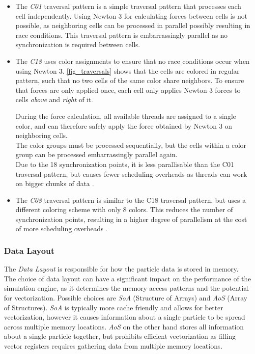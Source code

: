 \documentclass[conference]{IEEEtran}
\begin{document}
\begin{itemize}
    \item The \textit{C01} traversal pattern is a simple traversal pattern that processes each cell independently. Using Newton 3 for calculating forces between cells is not possible, as neighboring cells can be processed in parallel possibly resulting in race conditions. This traversal pattern is embarrassingly parallel as no synchronization is required between cells.
    \item The \textit{C18} uses color assignments to ensure that no race conditions occur when using Newton 3. \autoref{fig_traversals} shows that the cells are colored in regular pattern, such that no two cells of the same color share neighbors. To ensure that forces are only applied once, each cell only applies Newton 3 forces to cells \textit{above} and \textit{right} of it.

          During the force calculation, all available threads are assigned to a single color, and can therefore safely apply the force obtained by Newton 3 on neighboring cells. \\
          The color groups must be processed sequentially, but the cells within a color group can be processed embarrassingly parallel again. \\
          Due to the 18 synchronization points, it is less parallisable than the C01 traversal pattern, but causes fewer scheduling overheads as threads can work on bigger chunks of data \cite{NEWCOME2023115278}.
    \item The \textit{C08} traversal pattern is similar to the C18 traversal pattern, but uses a different coloring scheme with only 8 colors. This reduces the number of synchronization points, resulting in a higher degree of parallelism at the cost of more scheduling overheads \cite{NEWCOME2023115278}.
\end{itemize}


\subsubsection{Data Layout}

The \textit{Data Layout} is responsible for how the particle data is stored in memory. The choice of data layout can have a significant impact on the performance of the simulation engine, as it determines the memory access patterns and the potential for vectorization. Possible choices are \textit{SoA} (Structure of Arrays) and \textit{AoS} (Array of Structures). \textit{SoA} is typically more cache friendly and allows for better vectorization, however it causes information about a single particle to be spread across multiple memory locations. \textit{AoS} on the other hand stores all information about a single particle together, but prohibits efficient vectorization as filling vector registers requires gathering data from multiple memory locations.
\end{document}
